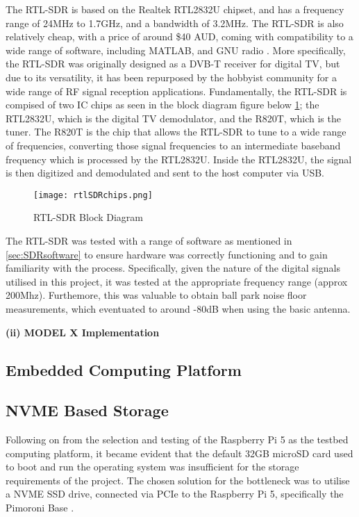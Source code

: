The RTL-SDR is based on the Realtek RTL2832U chipset, and has a frequency range of 24MHz to 1.7GHz, and a bandwidth of 3.2MHz. The RTL-SDR is also relatively cheap, with a price of around \$40 AUD, coming with compatibility to a wide range of software, including MATLAB, and GNU radio \cite{SDRdongle}. More specifically, the RTL-SDR was originally designed as a DVB-T receiver for digital TV, but due to its versatility, it has been repurposed by the hobbyist community for a wide range of RF signal reception applications. Fundamentally, the RTL-SDR is compised of two IC chips as seen in the block diagram figure below \ref*{fig:rtlSDRblock}; the RTL2832U, which is the digital TV demodulator, and the R820T, which is the tuner. The R820T is the chip that allows the RTL-SDR to tune to a wide range of frequencies, converting those signal frequencies to an intermediate baseband frequency which is processed by the RTL2832U. Inside the RTL2832U, the signal is then digitized and demodulated and sent to the host computer via USB.

\begin{figure}[htbp]
    \centering
    \texttt{[image: rtlSDRchips.png]}
    \caption{RTL-SDR Block Diagram \cite{RTLsdrBlockDiagram}}
    \label{fig:rtlSDRblock}
\end{figure}

\par \noindent
The RTL-SDR was tested with a range of software as mentioned in \ref*{sec:SDRsoftware} to ensure hardware was correctly functioning and to gain familiarity with the process. Specifically, given the nature of the digital signals utilised in this project, it was tested at the appropriate frequency range (approx 200Mhz). Furthemore, this was valuable to obtain ball park noise floor measurements, which eventuated to around -80dB when using the basic antenna. 

\vspace{0.5cm} \noindent 
\textbf{(ii) MODEL X Implementation}



\subsection{Embedded Computing Platform \label{sec:embedded computing}}


\subsection{NVME Based Storage \label{sec:storage}}
Following on from the selection and testing of the Raspberry Pi 5 as the testbed computing platform, it became evident that the default 32GB microSD card used to boot and run the operating system was insufficient for the storage requirements of the project. The chosen solution for the bottleneck was to utilise a NVME SSD drive, connected via PCIe to the Raspberry Pi 5, specifically the Pimoroni Base \cite{pimoroni_nvme_base}.

